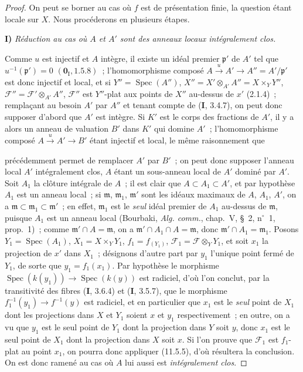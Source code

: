 \begin{proof}
On peut se borner au cas où $f$ est de présentation finie, la question étant
locale sur $X$. Nous procéderons en plusieurs étapes.

\medskip
\noindent\textbf{I)} \emph{Réduction au cas où $A$ et $A'$ sont des anneaux
locaux intégralement clos.}

Comme $u$ est injectif et $A$ intègre, il existe un idéal premier
$\mathfrak p'$ de $A'$ tel que $u^{-1}(\mathfrak p')=0$
$(\mathbf 0_{\mathrm I},1.5.8)$~; l'homomorphisme composé
$A\xrightarrow{u}A'\to A''=A'/\mathfrak p'$ est donc injectif et local, et si
$Y''=\operatorname{Spec}(A'')$, $X''=X'\otimes_{A'}A''=X\times_Y Y''$,
$\mathcal F''=\mathcal F'\otimes_{A'}A''$, $\mathcal F''$ est $Y''$-plat aux
points de $X''$ au-dessus de $x'$ (2.1.4)~; remplaçant au besoin $A'$ par $A''$
et tenant compte de (\textbf I, 3.4.7), on peut donc supposer d'abord que $A'$
est intègre. Si $K'$ est le corps des fractions de $A'$, il y a alors un anneau
de valuation $B'$ dans $K'$ qui domine $A'$~; l'homomorphisme composé
$A\xrightarrow{u}A'\to B'$ étant injectif et local, le même raisonnement que


précédemment permet de remplacer $A'$ par $B'$~; on peut donc supposer l'anneau
local $A'$ intégralement clos, $A$ étant un sous-anneau local de $A'$ dominé par
$A'$. Soit $A_1$ la clôture intégrale de $A$~; il est clair que
$A\subset A_1\subset A'$, et par hypothèse $A_1$ est un anneau local~; si
$\mathfrak m$, $\mathfrak m_1$, $\mathfrak m'$ sont les idéaux maximaux de
$A$, $A_1$, $A'$, on a $\mathfrak m\subset\mathfrak m_1\subset\mathfrak m'$~;
en effet, $\mathfrak m_1$ est le \emph{seul} idéal premier de $A_1$ au-dessus de
$\mathfrak m$, puisque $A_1$ est un anneau local (Bourbaki,
\emph{Alg. comm.}, chap.~V, \S~2, n$^\circ$~1, prop.~1)~; comme
$\mathfrak m'\cap A=\mathfrak m$, on a
$\mathfrak m'\cap A_1\cap A=\mathfrak m$, donc
$\mathfrak m'\cap A_1=\mathfrak m_1$. Posons
$Y_1=\operatorname{Spec}(A_1)$, $X_1=X\times_Y Y_1$, $f_1=f_{(Y_1)}$,
$\mathcal F_1=\mathcal F\otimes_Y Y_1$, et soit $x_1$ la projection de $x'$ dans
$X_1$~; désignons d'autre part par $y_1$ l'unique point fermé de $Y_1$, de sorte
que $y_1=f_1(x_1)$. Par hypothèse le morphisme
$\operatorname{Spec}(k(y_1))\to\operatorname{Spec}(k(y))$ est radiciel, d'où
l'on conclut, par la transitivité des fibres (\textbf I, 3.6.4) et
(\textbf I, 3.5.7), que le morphisme $f_1^{-1}(y_1)\to f^{-1}(y)$ est radiciel,
et en particulier que $x_1$ est le \emph{seul} point de $X_1$ dont les
projections dans $X$ et $Y_1$ soient $x$ et $y_1$ respectivement~; en outre, on
a vu que $y_1$ est le seul point de $Y_1$ dont la projection dans $Y$ soit $y$,
donc $x_1$ est le seul point de $X_1$ dont la projection dans $X$ soit $x$. Si
l'on prouve que $\mathcal F_1$ est $f_1$-plat au point $x_1$, on pourra donc
appliquer (11.5.5), d'où résultera la conclusion. On est donc ramené au cas où
$A$ lui aussi est \emph{intégralement clos}.


\end{proof}
